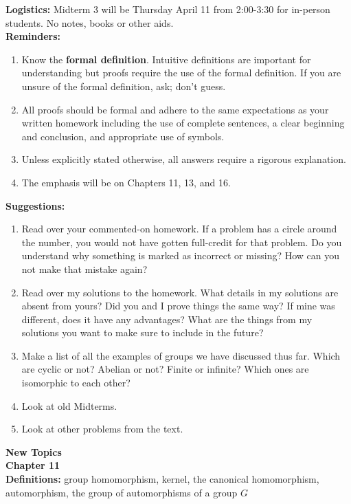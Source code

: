 \documentclass[12pt]{article}
\begin{document}
\textbf{Logistics:} Midterm 3 will be Thursday April 11 from 2:00-3:30 for in-person students. No notes, books or other aids.\\

\textbf{Reminders:}
\begin{enumerate}
	\item Know the \textbf{formal definition}. Intuitive definitions are important for understanding but proofs require the use of the formal definition. If you are unsure of the formal definition, ask; don't guess.
	\item All proofs should be formal and adhere to the same expectations as your written homework including the use of complete sentences, a clear beginning and conclusion, and appropriate use of symbols.
	\item Unless explicitly stated otherwise, all answers require a rigorous explanation.
	\item The emphasis will be on Chapters 11, 13, and 16.
\end{enumerate}

\textbf{Suggestions:}
\begin{enumerate}
	\item Read over your commented-on homework. If a problem has a circle around the number, you would not have gotten full-credit for that problem. Do you understand why something is marked as incorrect or missing? How can you not make that mistake again?
	\item Read over my solutions to the homework. What details in my solutions are absent from yours? Did you and I prove things the same way? If mine was different, does it have any advantages? What are the things from my solutions you want to make sure to include in the future?
	\item Make a list of all the examples of groups we have discussed thus far. Which are cyclic or not? Abelian or not? Finite or infinite? Which ones are isomorphic to each other?
	\item Look at old Midterms.
	\item Look at other problems from the text.
\end{enumerate}

\textbf{New Topics}\\

\noindent \textbf{Chapter 11}\\

\noindent \textbf{Definitions:} group homomorphism, kernel, the canonical homomorphism, automorphism, the group of automorphisms of a group $G$\\
\end{document}
